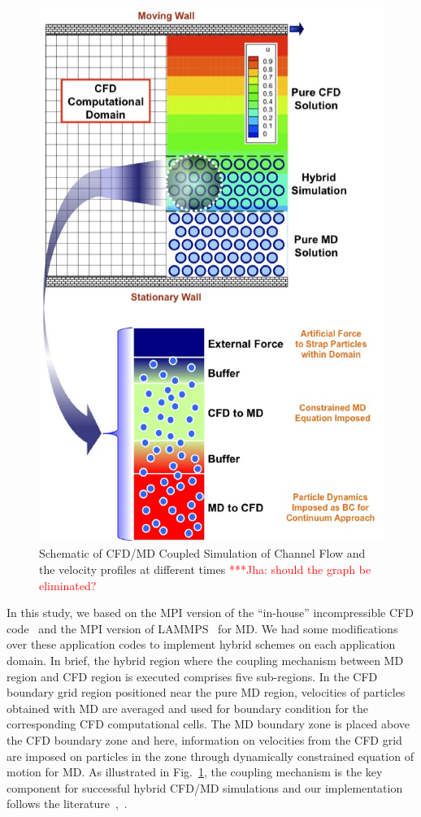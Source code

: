 \documentclass[conference,final]{IEEEtran}
\newcommand{\jhanote}[1]{ {\textcolor{red} { ***Jha: #1 }}}
\newcommand{\jhanote}[1]{}
\begin{document}
\begin{figure}
\centering
\includegraphics[scale=0.33]{fig1.eps}
\caption{\small Schematic of CFD/MD Coupled Simulation of Channel Flow
  and the velocity profiles at different times \jhanote{should the
    graph be eliminated?}}
\label{Fig:Couette}
\end{figure}

In this study, we based on the MPI version of the ``in-house''
incompressible CFD code~\cite{Lee} and the MPI version of LAMMPS~\cite{LAMMPS} for MD. We had some modifications over these application codes to implement hybrid schemes on each application domain. In brief, the hybrid region where the coupling mechanism between MD region and CFD region is executed comprises five sub-regions. In the CFD boundary grid region positioned near the pure MD region, velocities of particles obtained with MD are averaged and used for boundary condition for the corresponding CFD computational cells. The MD boundary zone is placed above the CFD boundary zone and here, information on velocities from the CFD grid are imposed on particles in the zone through dynamically constrained equation of motion for MD. As illustrated in Fig.~\ref{Fig:Couette}, the coupling mechanism is the key component for successful hybrid CFD/MD simulations and our implementation follows the literature~\cite{Nie},~\cite{Yen}.
\end{document}
